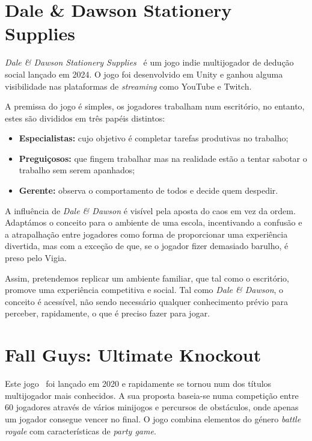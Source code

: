 \section{Dale \& Dawson Stationery Supplies}
\label{sec:daleDawson}

\textit{Dale \& Dawson Stationery Supplies}~\cite{StripedLabs2024} é um jogo indie multijogador de dedução social lançado em 2024. O jogo foi desenvolvido em Unity e ganhou alguma visibilidade nas plataformas de \textit{streaming} como YouTube e Twitch.

A premissa do jogo é simples, os jogadores trabalham num escritório, no entanto, estes são divididos em três papéis distintos:

\begin{itemize}
   \item \textbf{Especialistas:} cujo objetivo é completar tarefas produtivas no trabalho;
   \item \textbf{Preguiçosos:} que fingem trabalhar mas na realidade estão a tentar sabotar o trabalho sem serem apanhados;
   \item \textbf{Gerente:} observa o comportamento de todos e decide quem despedir.
\end{itemize}

A influência de \textit{Dale \& Dawson} é visível pela aposta do caos em vez da ordem. Adaptámos o conceito para o ambiente de uma escola, incentivando a confusão e a atrapalhação entre jogadores como forma de proporcionar uma experiência divertida, mas com a exceção de que, se o jogador fizer demasiado barulho, é preso pelo Vigia.

Assim, pretendemos replicar um ambiente familiar, que tal como o escritório, promove uma experiência competitiva e social. Tal como \textit{Dale \& Dawson}, o conceito é acessível, não sendo necessário qualquer conhecimento prévio para perceber, rapidamente, o que é preciso fazer para jogar.


\section{Fall Guys: Ultimate Knockout}
\label{sec:fallGuys}

Este jogo~\cite{Mediatonic2020} foi lançado em 2020 e rapidamente se tornou num dos títulos multijogador mais conhecidos. A sua proposta baseia-se numa competição entre 60 jogadores através de vários minijogos e percursos de obstáculos, onde apenas um jogador consegue vencer no final. O jogo combina elementos do género \textit{battle royale} com características de \textit{party game}.

